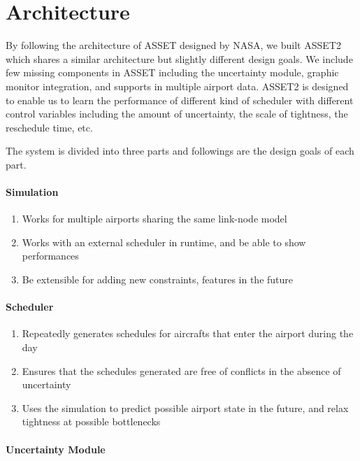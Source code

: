 \documentclass[conference]{IEEEtran}
\begin{document}
\section{Architecture}

By following the architecture of ASSET designed by NASA, we built ASSET2 which shares a similar architecture but slightly different design goals. We include few missing components in ASSET including the uncertainty module, graphic monitor integration, and supports in multiple airport data. ASSET2 is designed to enable us to learn the performance of different kind of scheduler with different control variables including the amount of uncertainty, the scale of tightness, the reschedule time, etc.

The system is divided into three parts and followings are the design goals of each part.

\paragraph{Simulation}

\begin{enumerate}
    \item Works for multiple airports sharing the same link-node model
    \item Works with an external scheduler in runtime, and be able to show performances
    \item Be extensible for adding new constraints, features in the future
\end{enumerate}

\paragraph{Scheduler}

\begin{enumerate}
    \item Repeatedly generates schedules for aircrafts that enter the airport during the day
    \item Ensures that the schedules generated are free of conflicts in the absence of uncertainty
    \item Uses the simulation to predict possible airport state in the future, and relax tightness at possible bottlenecks
\end{enumerate}

\paragraph{Uncertainty Module}
\end{document}
